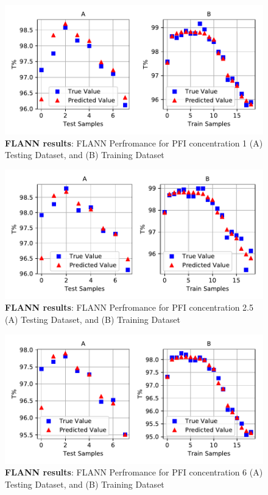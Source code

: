 \documentclass[]{article}
\begin{document}
\begin{figure}
\centering
\includegraphics{Report_files/figure-latex/transmitflannplot1-1.pdf}
\caption{\label{fig:transmitflannplot1}\textbf{FLANN results}: FLANN Perfromance for PFI concentration 1 (A) Testing Dataset, and (B) Training Dataset}
\end{figure}

\begin{figure}
\centering
\includegraphics{Report_files/figure-latex/transmitflannplot25-1.pdf}
\caption{\label{fig:transmitflannplot25}\textbf{FLANN results}: FLANN Perfromance for PFI concentration 2.5 (A) Testing Dataset, and (B) Training Dataset}
\end{figure}

\begin{figure}
\centering
\includegraphics{Report_files/figure-latex/transmitflannplot6-1.pdf}
\caption{\label{fig:transmitflannplot6}\textbf{FLANN results}: FLANN Perfromance for PFI concentration 6 (A) Testing Dataset, and (B) Training Dataset}
\end{figure}
\end{document}
